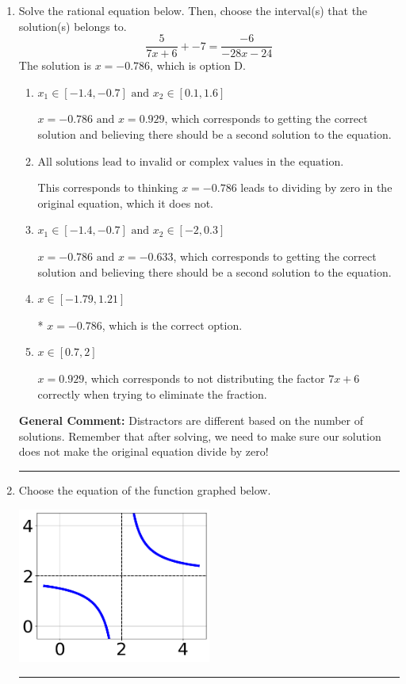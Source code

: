 \documentclass{extbook}[14pt]
\newcommand{\litem}[1]{\item #1

\rule{\textwidth}{0.4pt}}
\begin{document}
\begin{enumerate}\litem{
Solve the rational equation below. Then, choose the interval(s) that the solution(s) belongs to.
\[ \frac{5}{7x + 6} + -7 = \frac{-6}{-28x -24} \]The solution is \( x = -0.786 \), which is option D.\begin{enumerate}[label=\Alph*.]
\item \( x_1 \in [-1.4, -0.7] \text{ and } x_2 \in [0.1,1.6] \)

$x = -0.786 \text{ and } x = 0.929$, which corresponds to getting the correct solution and believing there should be a second solution to the equation.
\item \( \text{All solutions lead to invalid or complex values in the equation.} \)

This corresponds to thinking $x = -0.786$ leads to dividing by zero in the original equation, which it does not.
\item \( x_1 \in [-1.4, -0.7] \text{ and } x_2 \in [-2,0.3] \)

$x = -0.786 \text{ and } x = -0.633$, which corresponds to getting the correct solution and believing there should be a second solution to the equation.
\item \( x \in [-1.79,1.21] \)

* $x = -0.786$, which is the correct option.
\item \( x \in [0.7,2] \)

$x = 0.929$, which corresponds to not distributing the factor $7x + 6$ correctly when trying to eliminate the fraction.
\end{enumerate}

\textbf{General Comment:} Distractors are different based on the number of solutions. Remember that after solving, we need to make sure our solution does not make the original equation divide by zero!
}
\litem{
Choose the equation of the function graphed below.

\begin{center}
    \includegraphics[width=0.5\textwidth]{../Figures/rationalGraphToEquationC.png}
\end{center}


}
\end{enumerate}
\end{document}
